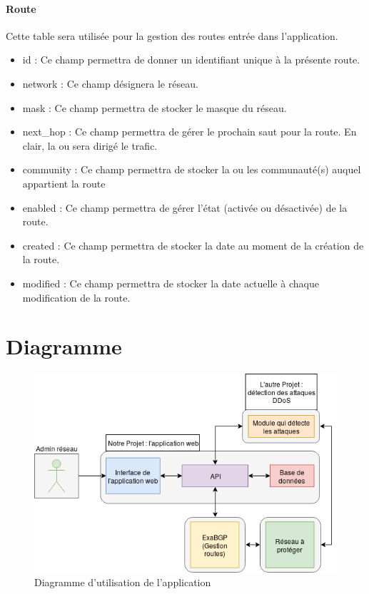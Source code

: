 \paragraph{Route} Cette table sera utilisée pour la gestion des routes entrée dans l'application.
\begin{itemize}
    \item id : Ce champ permettra de donner un identifiant unique à la présente route.
    \item network : Ce champ désignera le réseau.
    \item mask : Ce champ permettra de stocker le masque du réseau.
    \item next\_hop : Ce champ permettra de gérer le prochain saut pour la route. En clair, la ou sera dirigé le trafic.
    \item community : Ce champ permettra de stocker la ou les communauté(s) auquel appartient la route
    \item enabled : Ce champ permettra de gérer l'état (activée ou désactivée) de la route.
    \item created : Ce champ permettra de stocker la date au moment de la création de la route.
    \item modified : Ce champ permettra de stocker la date actuelle à chaque modification de la route.
\end{itemize}

\section{Diagramme}

\begin{figure}[H]
    \includegraphics[width=\textwidth]{./medias/use_cases3.png}
    \caption{Diagramme d'utilisation de l'application}
    \label{fig:use_cases}
\end{figure}

